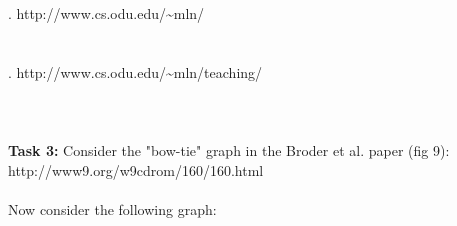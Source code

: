 \documentclass{article}
\begin{document}
		. http://www.cs.odu.edu/\~{}mln/\\
		\\\\
		. http://www.cs.odu.edu/\~{}mln/teaching/\\
		\\\\\\
		\textbf{Task 3:} Consider the "bow-tie" graph in the Broder et al. paper (fig 9):\\
		http://www9.org/w9cdrom/160/160.html\\\\
		Now consider the following graph:\\\\
\end{document}
